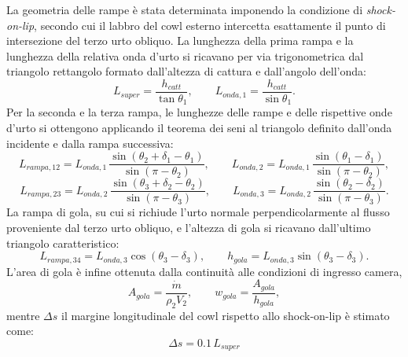 La geometria delle rampe è stata determinata imponendo la condizione di \textit{shock-on-lip}, secondo cui il labbro del cowl esterno intercetta esattamente il punto di intersezione del terzo urto obliquo. La lunghezza della prima rampa e la lunghezza della relativa onda d'urto si ricavano per via trigonometrica dal triangolo rettangolo formato dall'altezza di cattura e dall'angolo dell'onda:
\begin{equation*}
    L_{super} = \frac{h_{catt}}{\tan\theta_1}, \qquad L_{onda,1} = \frac{h_{catt}}{\sin\theta_1}.
\end{equation*}
Per la seconda e la terza rampa, le lunghezze delle rampe e delle rispettive onde d'urto si ottengono applicando il teorema dei seni al triangolo definito dall'onda incidente e dalla rampa successiva:
\begin{equation*}
    L_{rampa,12} = L_{onda,1}\,\frac{\sin(\theta_2+\delta_1-\theta_1)}{\sin(\pi-\theta_2)}, \qquad
    L_{onda,2} = L_{onda,1}\,\frac{\sin(\theta_1-\delta_1)}{\sin(\pi-\theta_2)},
\end{equation*}
\begin{equation*}
    L_{rampa,23} = L_{onda,2}\,\frac{\sin(\theta_3+\delta_2-\theta_2)}{\sin(\pi-\theta_3)}, \qquad
    L_{onda,3} = L_{onda,2}\,\frac{\sin(\theta_2-\delta_2)}{\sin(\pi-\theta_3)}.
\end{equation*}
La rampa di gola, su cui si richiude l'urto normale perpendicolarmente al flusso proveniente dal terzo urto obliquo, e l'altezza di gola si ricavano dall'ultimo triangolo caratteristico:
\begin{equation*}
    L_{rampa,34} = L_{onda,3}\cos(\theta_3-\delta_3), \qquad h_{gola} = L_{onda,3}\sin(\theta_3-\delta_3).
\end{equation*}
L'area di gola è infine ottenuta dalla continuità alle condizioni di ingresso camera,
\begin{equation*}
    A_{gola} = \frac{\dot{m}}{\rho_2 V_2}, \qquad w_{gola} = \frac{A_{gola}}{h_{gola}},
\end{equation*}
mentre $\Delta s$ il margine longitudinale del cowl rispetto allo shock-on-lip è stimato come:
\begin{equation*}
     \Delta s = 0.1\,L_{super}
\end{equation*}




